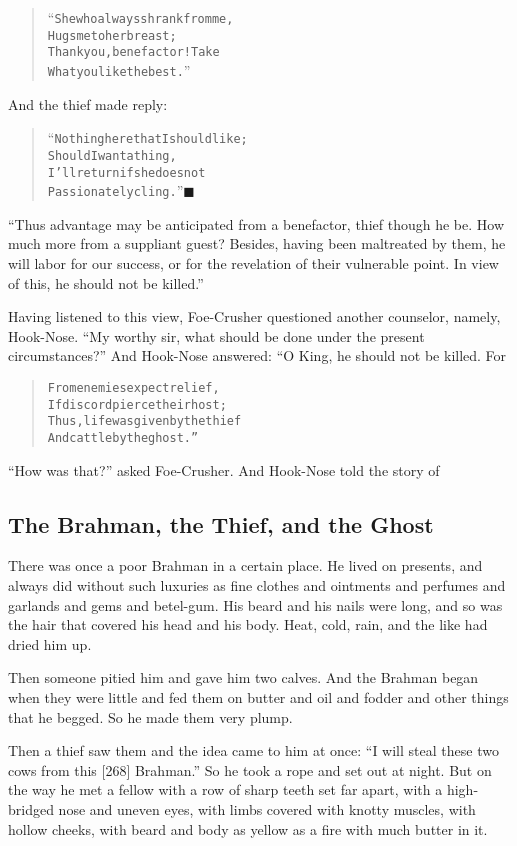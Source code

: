 \documentclass[article, twoside, 14pt]{memoir}
\newcommand{\qed}{\hfill \ensuremath{\blacksquare}}
\renewenvironment{verbatim}{%
\begin{quote}%
\vskip -10pt%
\begin{alltt}\normalfont\large}{\end{alltt}%
\end{quote}%
\vskip -10pt
} %
\begin{document}
\begin{verbatim}
“She who always shrank from me,
Hugs me to her breast;
Thank you, benefactor! Take
What you like the best.”
\end{verbatim}
And the thief made reply:

\begin{verbatim}
“Nothing here that I should like;
Should I want a thing,
I'll return if she does not
Passionately cling.”\hyperref[s56]{\qed}
\end{verbatim}
``Thus advantage may be anticipated from a benefactor, thief though he be. How much more from a suppliant guest? Besides, having been maltreated by them, he will labor for our success, or for the revelation of their vulnerable point. In view of this, he should not be killed.''

Having listened to this view, Foe-Crusher questioned another
counselor, namely, Hook-Nose.
``My worthy sir, what should be done under the present circumstances?''
And Hook-Nose answered: “O King, he should not be killed. For

\begin{verbatim}
From enemies expect relief,
    If discord pierce their host;
Thus, life was given by the thief
    And cattle by the ghost.”
\end{verbatim}
``How was that?'' asked Foe-Crusher. And Hook-Nose told the story
of

\subsection{The Brahman, the Thief, and the Ghost}

\label{s57}

There was once a poor Brahman in a certain place. He lived on
presents, and always did without such luxuries as fine clothes and
ointments and perfumes and garlands and gems and betel-gum. His
beard and his nails were long, and so was the hair that covered his
head and his body. Heat, cold, rain, and the like had dried him
up.

Then someone pitied him and gave him two calves. And the Brahman
began when they were little and fed them on butter and oil and
fodder and other things that he begged. So he made them very
plump.

Then a thief saw them and the idea came to him at once:
``I will steal these two cows from this [268] Brahman.'' So he took
a rope and set out at night. But on the way he met a fellow with a
row of sharp teeth set far apart, with a high-bridged nose and
uneven eyes, with limbs covered with knotty muscles, with hollow
cheeks, with beard and body as yellow as a fire with much butter in
it.
\end{document}

